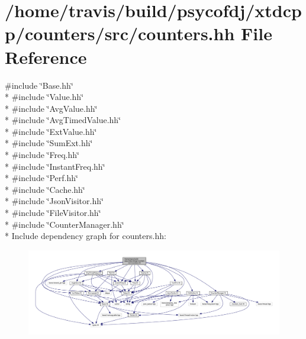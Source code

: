 \hypertarget{counters_8hh}{\section{/home/travis/build/psycofdj/xtdcpp/counters/src/counters.hh File Reference}
\label{counters_8hh}
}
{\ttfamily \#include \char`\"{}Base.\-hh\char`\"{}}\\*
{\ttfamily \#include \char`\"{}Value.\-hh\char`\"{}}\\*
{\ttfamily \#include \char`\"{}Avg\-Value.\-hh\char`\"{}}\\*
{\ttfamily \#include \char`\"{}Avg\-Timed\-Value.\-hh\char`\"{}}\\*
{\ttfamily \#include \char`\"{}Ext\-Value.\-hh\char`\"{}}\\*
{\ttfamily \#include \char`\"{}Sum\-Ext.\-hh\char`\"{}}\\*
{\ttfamily \#include \char`\"{}Freq.\-hh\char`\"{}}\\*
{\ttfamily \#include \char`\"{}Instant\-Freq.\-hh\char`\"{}}\\*
{\ttfamily \#include \char`\"{}Perf.\-hh\char`\"{}}\\*
{\ttfamily \#include \char`\"{}Cache.\-hh\char`\"{}}\\*
{\ttfamily \#include \char`\"{}Json\-Visitor.\-hh\char`\"{}}\\*
{\ttfamily \#include \char`\"{}File\-Visitor.\-hh\char`\"{}}\\*
{\ttfamily \#include \char`\"{}Counter\-Manager.\-hh\char`\"{}}\\*
Include dependency graph for counters.\-hh\-:
\nopagebreak
\begin{figure}[H]
\begin{center}
\leavevmode
\includegraphics[width=350pt]{counters_8hh__incl}
\end{center}
\end{figure}
